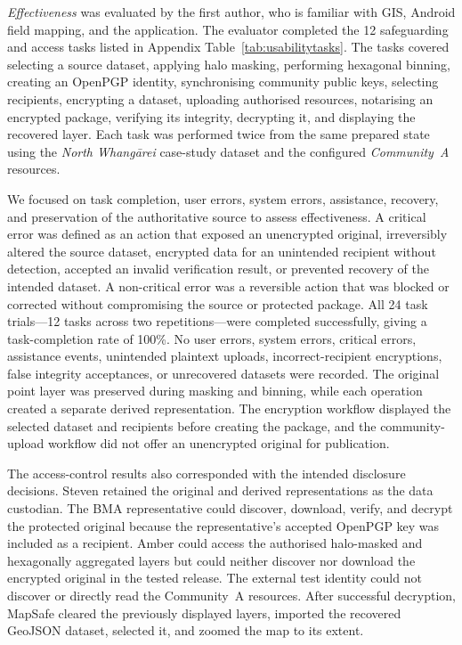\documentclass[]{interact}
\begin{document}
\textit{Effectiveness} was evaluated by the first author, who is familiar with GIS, Android field mapping, and the application. The evaluator completed the 12 safeguarding and access tasks listed in Appendix Table~\ref{tab:usabilitytasks}. The tasks covered selecting a source dataset, applying halo masking, performing hexagonal binning, creating an OpenPGP identity, synchronising community public keys, selecting recipients, encrypting a dataset, uploading authorised resources, notarising an encrypted package, verifying its integrity, decrypting it, and displaying the recovered layer. Each task was performed twice from the same prepared state using the \textit{North Whang\={a}rei} case-study dataset and the configured \textit{Community~A} resources.

We focused on task completion, user errors, system errors, assistance, recovery, and preservation of the authoritative source to assess effectiveness. A critical error was defined as an action that exposed an unencrypted original, irreversibly altered the source dataset, encrypted data for an unintended recipient without detection, accepted an invalid verification result, or prevented recovery of the intended dataset. A non-critical error was a reversible action that was blocked or corrected without compromising the source or protected package. All 24 task trials---12 tasks across two repetitions---were completed successfully, giving a task-completion rate of 100\%. No user errors, system errors, critical errors, assistance events, unintended plaintext uploads, incorrect-recipient encryptions, false integrity acceptances, or unrecovered datasets were recorded. The original point layer was preserved during masking and binning, while each operation created a separate derived representation. The encryption workflow displayed the selected dataset and recipients before creating the package, and the community-upload workflow did not offer an unencrypted original for publication.

The access-control results also corresponded with the intended disclosure decisions. Steven retained the original and derived representations as the data custodian. The BMA representative could discover, download, verify, and decrypt the protected original because the representative's accepted OpenPGP key was included as a recipient. Amber could access the authorised halo-masked and hexagonally aggregated layers but could neither discover nor download the encrypted original in the tested release. The external test identity could not discover or directly read the Community~A resources. After successful decryption, MapSafe cleared the previously displayed layers, imported the recovered GeoJSON dataset, selected it, and zoomed the map to its extent.
\end{document}
